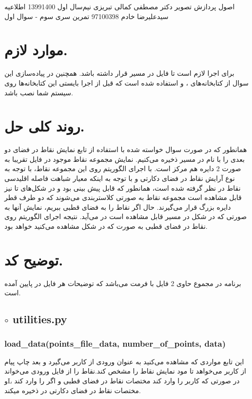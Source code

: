 \documentclass[a4paper,12pt]{article}
\begin{document}
\handout
{اصول پردازش تصویر}
{دکتر مصطفی کمالی تبریزی}
{نیم‌سال اول 1399\lr{-}1400}
{اطلاعیه}
{سیدعلیرضا خادم}
{97100398}
{تمرین سری سوم - سوال اول}
\section*{موارد لازم.}
برای اجرا لازم است تا فایل
در مسیر
قرار داشته باشد. همچنین در پیاده‌سازی این سوال از کتابخانه‌های 
،
و
استفاده شده است که قبل از اجرا بایستی این کتابخانه‌ها روی سیستم شما نصب باشد.
\section*{روند کلی حل.}
همانطور که در صورت سوال خواسته شده با استفاده از تابع 
نمایش نقاط در فضای دو بعدی را با نام 
در مسیر 
ذخیره می‌کنیم. نمایش مجموعه نقاط موجود در فایل 
تقریبا به صورت 2 دایره هم مرکز است. با اجرای الگوریتم 
روی این مجموعه نقاط، با توجه به نوع آرایش نقاط در فضای دکارتی و با توجه به اینکه معیار شباهت  فاصله اقلیدسی نقاط در نظر گرفته شده است، همانطور که قابل پیش بینی بود و در شکل‌های 
تا 
نیز قابل مشاهده است مجموعه نقاط به صورتی کلاستربندی می‌شوند که دو طرف قطر دایره بزرگ قرار می‌گیرند. حال اگر نقاط را به فضای قطبی ببریم، نمایش آنها به صورتی که در شکل 
در مسیر
قابل مشاهده است در می‌آید. نتیجه اجرای الگوریتم 
روی نقاط در فضای قطبی به صورت که در شکل 
مشاهده می‌کنید خواهد بود.



\section*{توضیح کد.}
برنامه در مجموع حاوی 2 فایل با فرمت
می‌باشد که توضیحات هر فایل در پایین آمده است.
\subsection*{$\circ$ utilities.py}
\subsubsection*{load\_data(points\_file\_data, number\_of\_points, data)}
این  تابع مواردی که مشاهده می‌کنید به عنوان ورودی از کاربر می‌گیرد و بعد چاپ پیام 
از کاربر می‌خواهد تا مود نمایش نقاط را مشخص کند.نقاط را از فایل ورودی می‌خواند وL در صورتی که کاربر
را وارد کند مختصات نقاط در فضای قطبی و اگر 
را وارد کند مختصات نقاط در فضای دکارتی در
ذخیره میکند.
\end{document}
